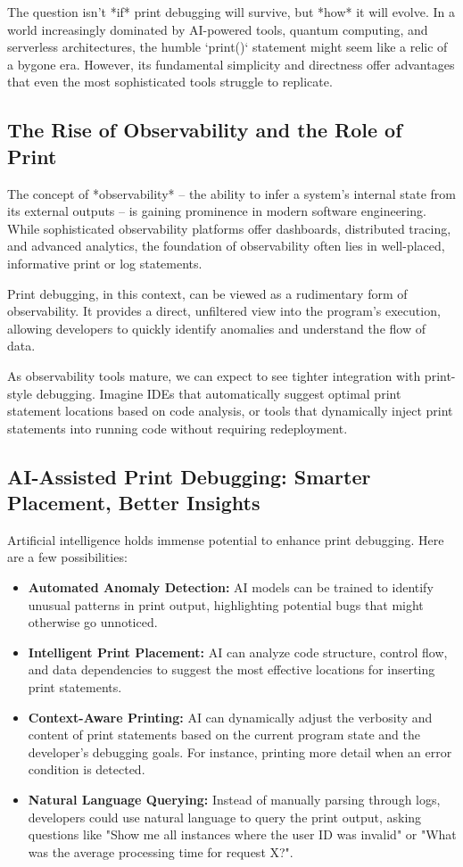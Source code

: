 \documentclass{article}
\begin{document}
{{{{The question isn't *if* print debugging will survive, but *how* it will evolve. In a world increasingly dominated by AI-powered tools, quantum computing, and serverless architectures, the humble `print()` statement might seem like a relic of a bygone era. However, its fundamental simplicity and directness offer advantages that even the most sophisticated tools struggle to replicate.

\subsection*{The Rise of Observability and the Role of Print}

The concept of *observability* – the ability to infer a system's internal state from its external outputs – is gaining prominence in modern software engineering.  While sophisticated observability platforms offer dashboards, distributed tracing, and advanced analytics, the foundation of observability often lies in well-placed, informative print or log statements.

Print debugging, in this context, can be viewed as a rudimentary form of observability.  It provides a direct, unfiltered view into the program's execution, allowing developers to quickly identify anomalies and understand the flow of data.

As observability tools mature, we can expect to see tighter integration with print-style debugging.  Imagine IDEs that automatically suggest optimal print statement locations based on code analysis, or tools that dynamically inject print statements into running code without requiring redeployment.

\subsection*{AI-Assisted Print Debugging: Smarter Placement, Better Insights}

Artificial intelligence holds immense potential to enhance print debugging.  Here are a few possibilities:

\begin{itemize}
    \item \textbf{Automated Anomaly Detection:} AI models can be trained to identify unusual patterns in print output, highlighting potential bugs that might otherwise go unnoticed.
    \item \textbf{Intelligent Print Placement:} AI can analyze code structure, control flow, and data dependencies to suggest the most effective locations for inserting print statements.
    \item \textbf{Context-Aware Printing:} AI can dynamically adjust the verbosity and content of print statements based on the current program state and the developer's debugging goals. For instance, printing more detail when an error condition is detected.
    \item \textbf{Natural Language Querying:} Instead of manually parsing through logs, developers could use natural language to query the print output, asking questions like "Show me all instances where the user ID was invalid" or "What was the average processing time for request X?".
\end{itemize}

}}}}
\end{document}
